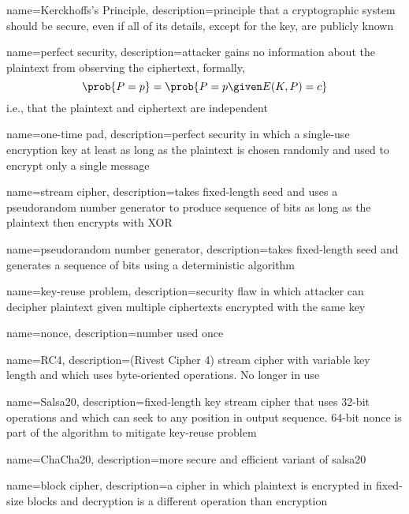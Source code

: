 {
    name={Kerckhoffs’s Principle},
    description={principle that a cryptographic system should be secure, even if all of its details, except for the key, are publicly known}
}

{
    name={perfect security},
    description={attacker gains no information about the plaintext from observing the ciphertext, formally, \[\prob{P = p} = \prob{P = p \given E(K, P) = c}\] i.e., that the plaintext and ciphertext are independent}
}

{
    name={one-time pad},
    description={perfect security in which a single-use encryption key at least as long as the plaintext is chosen randomly and used to encrypt only a single message}
}

{
    name={stream cipher},
    description={takes fixed-length seed and uses a \gls{pseudorandom number generator} to produce sequence of bits as long as the plaintext then encrypts with XOR}
}

{
    name={pseudorandom number generator},
    description={takes fixed-length seed and generates a sequence of bits using a deterministic algorithm}
}

{
    name={key-reuse problem},
    description={security flaw in which attacker can decipher plaintext given multiple ciphertexts encrypted with the same key}
}

{
    name={nonce},
    description={number used once}
}

{
    name={RC4},
    description={(Rivest Cipher 4) stream cipher with variable key length and which uses byte-oriented operations. No longer in use}
}

{
    name={Salsa20},
    description={fixed-length key stream cipher that uses 32-bit operations and which can seek to any position in output sequence. 64-bit \gls{nonce} is part of the algorithm to mitigate \gls{key-reuse problem}}
}

{
    name={ChaCha20},
    description={more secure and efficient variant of \gls{salsa20}}
}

{
    name={block cipher},
    description={a cipher in which plaintext is encrypted in fixed-size blocks and decryption is a different operation than encryption}
}

